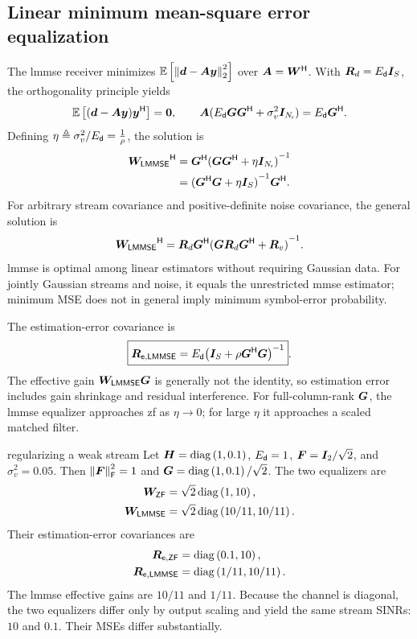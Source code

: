 \subsection{Linear minimum mean-square error equalization}
The \ac{lmmse} receiver minimizes
$\mathbb{E}\left[\left\|\bm{d}-\bm{A}\bm{y}\right\|_2^2\right]$ over
$\bm{A}={\bm{W}}^{\mathsf{H}}$. With $\bm{R}_d=E_{\mathsf{d}}\bm{I}_{S}$,
the orthogonality principle yields
\begin{equation*}
	\mathbb{E}\left[(\bm{d}-\bm{A}\bm{y}){\bm{y}}^{\mathsf{H}}\right]=\bm{0},\qquad
	\bm{A}(E_{\mathsf{d}}\bm{G}{\bm{G}}^{\mathsf{H}}
	+\sigma_v^2\bm{I}_{N_{\mathsf{r}}})=E_{\mathsf{d}}{\bm{G}}^{\mathsf{H}}.
\end{equation*}
Defining $\eta\triangleq\sigma_v^2/E_{\mathsf{d}} = \frac{1}{\rho}$, the solution is
\begin{align}\label{eq:lmmse}
	{\bm{W}_{\mathsf{LMMSE}}}^{\mathsf{H}}
	&={\bm{G}}^{\mathsf{H}}
	{(\bm{G}{\bm{G}}^{\mathsf{H}}+\eta\bm{I}_{N_{\mathsf{r}}})}^{-1}\\
	&={({\bm{G}}^{\mathsf{H}}\bm{G}+\eta\bm{I}_{S})}^{-1}
	{\bm{G}}^{\mathsf{H}}.\nonumber
\end{align}
For arbitrary stream covariance and positive-definite noise
covariance, the general solution is
\begin{equation*}
	{\bm{W}_{\mathsf{LMMSE}}}^{\mathsf{H}}=\bm{R}_d{\bm{G}}^{\mathsf{H}}
	{(\bm{G}\bm{R}_d{\bm{G}}^{\mathsf{H}}+\bm{R}_v)}^{-1}.
\end{equation*}
\ac{lmmse} is optimal among linear estimators without requiring
Gaussian data. For jointly Gaussian streams and noise, it equals
the unrestricted \ac{mmse} estimator; minimum MSE does not in
general imply minimum symbol-error probability.

The estimation-error covariance is
\begin{equation}\label{eq:mmseerror}
	\boxed{\bm{R}_{\mathsf e,\mathsf{LMMSE}}
		=E_{\mathsf{d}}{\left(\bm{I}_{S}
			+\rho{\bm{G}}^{\mathsf{H}}\bm{G}\right)}^{-1}}.
\end{equation}
The effective gain $\bm{W}_{\mathsf{LMMSE}}\bm{G}$ is generally not
the identity, so estimation error includes gain shrinkage and
residual interference. For full-column-rank $\bm{G}$, the
\ac{lmmse} equalizer approaches \ac{zf} as $\eta\to0$; for
large $\eta$ it approaches a scaled matched filter.

\begin{example}{regularizing a weak stream}\label{ex:weak}
	Let $\bm{H}=\operatorname{diag}\left(1,0.1\right)$, $E_{\mathsf{d}}=1$,
	$\bm{F}=\bm{I}_2/\sqrt{2}$, and $\sigma_v^2=0.05$.
	Then $\left\|\bm{F}\right\|_{\mathsf{F}}^2=1$ and
	$\bm{G}=\operatorname{diag}\left(1,0.1\right)/\sqrt{2}$.
	The two equalizers are
	\begin{align*}
		\bm{W}_{\mathsf{ZF}}&=\sqrt{2}\operatorname{diag}\left(1,10\right),\\
		\bm{W}_{\mathsf{LMMSE}}&=\sqrt{2}\operatorname{diag}\left(10/11,10/11\right).
	\end{align*}
	Their estimation-error covariances are
	\begin{align*}
		\bm{R}_{\mathsf e,\mathsf{ZF}}&=\operatorname{diag}\left(0.1,10\right),\\
		\bm{R}_{\mathsf e,\mathsf{LMMSE}}&=\operatorname{diag}\left(1/11,10/11\right).
	\end{align*}
	The \ac{lmmse} effective gains are $10/11$ and $1/11$.
	Because the channel is diagonal, the two equalizers differ
	only by output scaling and yield the same stream SINRs:
	$10$ and $0.1$. Their MSEs differ substantially.
\end{example}

